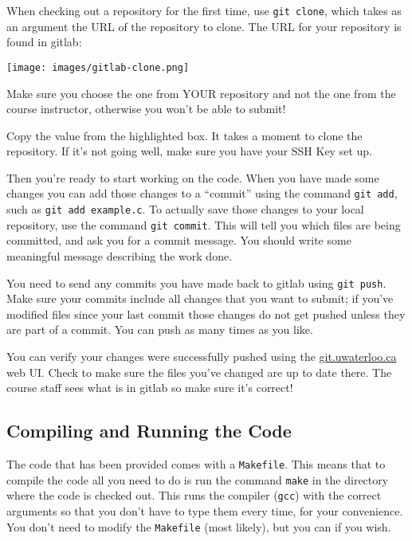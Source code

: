 When checking out a repository for the first time, use \texttt{git clone}, which takes as an argument the URL of the repository to clone. The URL for your repository is found in gitlab:

\begin{center}
	\texttt{[image: images/gitlab-clone.png]}
\end{center}

Make sure you choose the one from YOUR repository and not the one from the course instructor, otherwise you won't be able to submit!

Copy the value from the highlighted box. It takes a moment to clone the repository. If it's not going well, make sure you have your SSH Key set up.

Then you're ready to start working on the code. When you have made some changes you can add those changes to a ``commit'' using the command \texttt{git add}, such as \texttt{git add example.c}. To actually save those changes to your local repository, use the command \texttt{git commit}. This will tell you which files are being committed, and ask you for a commit message. You should write some meaningful message describing the work done.

You need to send any commits you have made back to gitlab using \texttt{git push}. Make sure your commits include all changes that you want to submit; if you've modified files since your last commit those changes do not get pushed unless they are part of a commit. You can push as many times as you like.

You can verify your changes were successfully pushed using the \url{git.uwaterloo.ca} web UI. Check to make sure the files you've changed are up to date there. The course staff sees what is in gitlab so make sure it's correct!

\subsection*{Compiling and Running the Code}

The code that has been provided comes with a \texttt{Makefile}. This means that to compile the code all you need to do is run the command \texttt{make} in the directory where the code is checked out. This runs the compiler (\texttt{gcc}) with the correct arguments so that you don't have to type them every time, for your convenience. You don't need to modify the \texttt{Makefile} (most likely), but you can if you wish.

